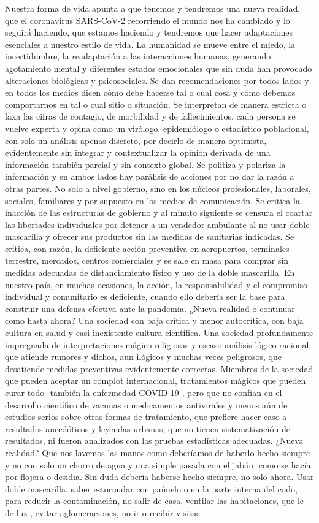 \documentclass[12pt,a4paper,openany]{book}
\begin{document}
Nuestra forma de vida apunta a que tenemos y tendremos una nueva realidad, que el coronavirus SARS-CoV-2 recorriendo el mundo nos ha cambiado y lo seguirá haciendo, que estamos haciendo y tendremos que hacer adaptaciones esenciales a nuestro estilo de vida. La humanidad se mueve entre el miedo, la incertidumbre, la readaptación a las interacciones humanas, generando agotamiento mental y diferentes estados emocionales que sin duda han provocado alteraciones biológicas y psicosociales. Se dan recomendaciones por todos lados y en todos los medios dicen cómo debe hacerse tal o cual cosa y cómo debemos comportarnos en tal o cual sitio o situación. Se interpretan de manera estricta o laxa las cifras de contagio, de morbilidad y de fallecimientos, cada persona se vuelve experta y opina como un virólogo, epidemiólogo o estadístico poblacional, con solo un análisis apenas discreto, por decirlo de manera optimista, evidentemente sin integrar y contextualizar la opinión derivada de una información también parcial y sin contexto global. Se politiza y polariza la información y en ambos lados hay parálisis de acciones por no dar la razón a otras partes. No solo a nivel gobierno, sino en los núcleos profesionales, laborales, sociales, familiares y por supuesto en los medios de comunicación. Se critica la inacción de las estructuras de gobierno y al minuto siguiente se censura el coartar las libertades individuales por detener a un vendedor ambulante al no usar doble mascarilla y ofrecer sus productos sin las medidas de sanitarias indicadas. Se critica, con razón, la deficiente acción preventiva en aeropuertos, terminales terrestre, mercados, centros comerciales y se sale en masa para comprar sin medidas adecuadas de distanciamiento físico y uso de la doble mascarilla. En nuestro país, en muchas ocasiones, la acción, la responsabilidad y el compromiso individual y comunitario es deficiente, cuando ello debería ser la base para construir una defensa efectiva ante la pandemia. ¿Nueva realidad o continuar como hasta ahora? Una sociedad con baja crítica y menor autocrítica, con baja cultura en salud y casi inexistente cultura científica. Una sociedad profundamente impregnada de interpretaciones mágico-religiosas y escaso análisis lógico-racional; que atiende rumores y dichos, aun ilógicos y muchas veces peligrosos, que desatiende medidas preventivas evidentemente correctas. Miembros de la sociedad que pueden aceptar un complot internacional, tratamientos mágicos que pueden curar todo -también la enfermedad COVID-19-, pero que no confían en el desarrollo científico de vacunas o medicamentos antivirales y menos aún de estudios serios sobre otras formas de tratamiento, que prefiere hacer caso a resultados anecdóticos y leyendas urbanas, que no tienen sistematización de resultados, ni fueron analizados con las pruebas estadísticas adecuadas. ¿Nueva realidad? Que nos lavemos las manos como deberíamos de haberlo hecho siempre y no con solo un chorro de agua y una simple pasada con el jabón, como se hacía por flojera o desidia. Sin duda debería haberse hecho siempre, no solo ahora. Usar doble mascarilla, saber estornudar con pañuelo o en la parte interna del codo, para reducir la contaminación, no salir de casa, ventilar las habitaciones, que le de luz , evitar aglomeraciones, no ir o recibir visitas 
\end{document}
